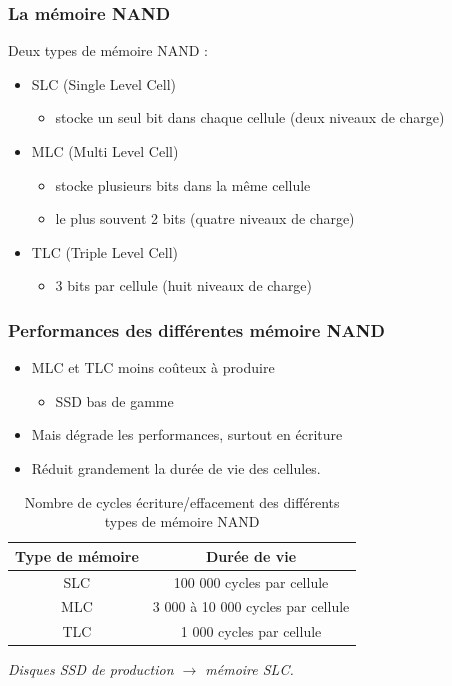 \begin{frame}
\frametitle{La mémoire NAND}
Deux types de mémoire NAND :
\begin{itemize}
\item SLC (Single Level Cell)
\begin{itemize}
\item stocke un seul bit dans chaque cellule (deux niveaux de charge)
\end{itemize}
\item MLC (Multi Level Cell)
\begin{itemize}
\item stocke plusieurs bits dans la même cellule
\item le plus souvent 2 bits (quatre niveaux de charge)
\end{itemize}
\item TLC (Triple Level Cell)
\begin{itemize}
\item 3 bits par cellule (huit niveaux de charge)
\end{itemize}
\end{itemize}
\end{frame}

\begin{frame}
\frametitle{Performances des différentes mémoire NAND}
\begin{itemize}
\item MLC et TLC moins coûteux à produire
\begin{itemize}
\item SSD bas de gamme
\end{itemize}

\item Mais dégrade les performances, surtout en écriture
\item Réduit grandement la durée de vie des cellules.
\end{itemize}

\begin{table}[htdp]
\caption{Nombre de cycles écriture/effacement des différents types de mémoire NAND}
\begin{center}
\begin{tabular}{c|c}
Type de mémoire & Durée de vie \\
\hline
SLC & 100 000 cycles par cellule \\
MLC &  3 000 à 10 000 cycles par cellule \\
TLC & 1 000 cycles par cellule \\
\end{tabular}
\end{center}
\label{default}
\end{table}
\textit{Disques SSD de production $\rightarrow$ mémoire SLC.}
\end{frame}

